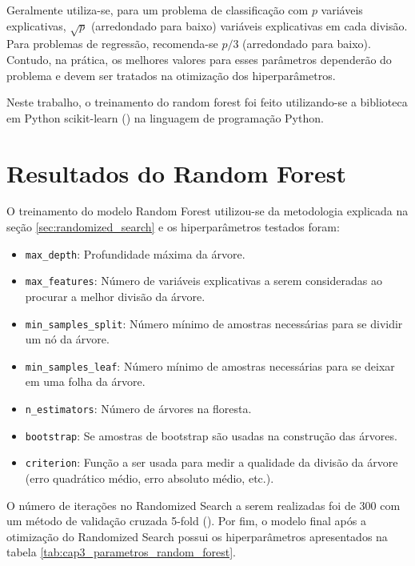 Geralmente utiliza-se, para um problema de classificação com $ p $ variáveis explicativas, $ \sqrt{p} $ (arredondado para baixo) variáveis explicativas ​​em cada divisão. Para problemas de regressão, recomenda-se $ p/3 $ (arredondado para baixo). Contudo, na prática, os melhores valores para esses parâmetros dependerão do problema e devem ser tratados na otimização dos hiperparâmetros.

Neste trabalho, o treinamento do random forest foi feito utilizando-se a biblioteca em Python scikit-learn (\citet{Sklearn}) na linguagem de programação Python.

\section{Resultados do Random Forest}
\label{sec:resultados_random_forest}

O treinamento do modelo Random Forest utilizou-se da metodologia explicada na seção \ref{sec:randomized_search} e os hiperparâmetros testados foram:

\begin{itemize}
	\item \verb|max_depth|: Profundidade máxima da árvore.
	\item \verb|max_features|: Número de variáveis explicativas a serem consideradas ao procurar a melhor divisão da árvore.
	\item \verb|min_samples_split|: Número mínimo de amostras necessárias para se dividir um nó da árvore.
	\item \verb|min_samples_leaf|: Número mínimo de amostras necessárias para se deixar em uma folha da árvore.
	\item \verb|n_estimators|: Número de árvores na floresta.
	\item \verb|bootstrap|: Se amostras de bootstrap são usadas na construção das árvores.
	\item \verb|criterion|: Função a ser usada para medir a qualidade da divisão da árvore (erro quadrático médio, erro absoluto médio, etc.).
\end{itemize}

O número de iterações no Randomized Search a serem realizadas foi de 300 com um método de validação cruzada 5-fold (\citet{Kohavi1995}). Por fim, o modelo final após a otimização do Randomized Search possui os hiperparâmetros apresentados na tabela \ref{tab:cap3_parametros_random_forest}.

